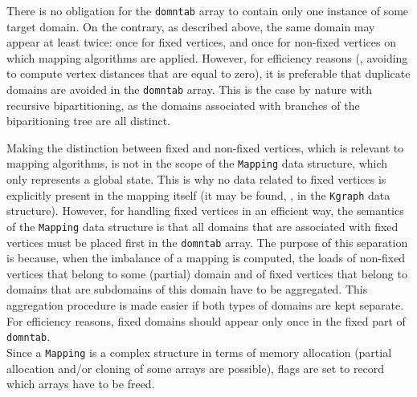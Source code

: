 There is no obligation for the \texttt{domntab} array to contain only
one instance of some target domain. On the contrary, as described
above, the same domain may appear at least twice: once for fixed
vertices, and once for non-fixed vertices on which mapping algorithms
are applied. However, for efficiency reasons (\eg, avoiding to compute
vertex distances that are equal to zero), it is preferable that
duplicate domains are avoided in the \texttt{domntab} array. This is
the case by nature with recursive bipartitioning, as the domains
associated with branches of the biparitioning tree are all distinct.

Making the distinction between fixed and non-fixed vertices, which is
relevant to mapping algorithms, is not in the scope of the
\texttt{Mapping} data structure, which only represents a global
state. This is why no data related to fixed vertices is explicitly
present in the mapping itself (it may be found, \eg, in the
\texttt{Kgraph} data structure).
However, for handling fixed vertices in an efficient way, the
semantics of the \texttt{Mapping} data structure is that all domains
that are associated with fixed vertices must be placed first in the
\texttt{domntab} array. The purpose of this separation is because,
when the imbalance of a mapping is computed, the loads of non-fixed
vertices that belong to some (partial) domain and of fixed vertices
that belong to domains that are subdomains of this domain have to be
aggregated. This aggregation procedure is made easier if both types of
domains are kept separate. For efficiency reasons, fixed domains
should appear only once in the fixed part of \texttt{domntab}.
\\

Since a \texttt{Mapping} is a complex structure in terms of memory
allocation (partial allocation and/or cloning of some arrays are
possible), flags are set to record which arrays have to be freed.


